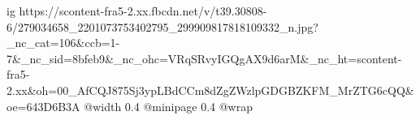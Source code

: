  
 
 
 
 

\ifcmt
  ig https://scontent-fra5-2.xx.fbcdn.net/v/t39.30808-6/279034658_2201073753402795_299909817818109332_n.jpg?_nc_cat=106&ccb=1-7&_nc_sid=8bfeb9&_nc_ohc=VRqSRvyIGQgAX9d6arM&_nc_ht=scontent-fra5-2.xx&oh=00_AfCQJ875Sj3ypLBdCCm8dZgZWzlpGDGBZKFM_MrZTG6cQQ&oe=643D6B3A
  @width 0.4
  @minipage 0.4
  @wrap \parpic[r]
\fi
